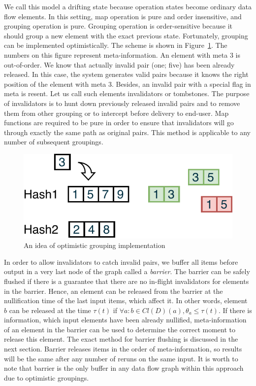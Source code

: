 We call this model a drifting state because operation states become ordinary data flow elements. In this setting, map operation is pure and order insensitive, and grouping operation is pure. Grouping operation is order-sensitive because it should group a new element with the exact previous state. Fortunately, grouping can be implemented optimistically. The scheme is shown in Figure~\ref{optimistic-grouping}. The numbers on this figure represent meta-information. An element with meta 3 is out-of-order. We know that actually invalid pair (one; five) has been already released. In this case, the system generates valid pairs because it knows the right position of the element with meta 3. Besides, an invalid pair with a special flag in meta is resent. Let us call such elements invalidators or tombstones. The purpose of invalidators is to hunt down previously released invalid pairs and to remove them from other grouping or to intercept before delivery to end-user. Map functions are required to be pure in order to ensure that invalidators will go through exactly the same path as original pairs. This method is applicable to any number of subsequent groupings.
 
\begin{figure}[htbp]
  \centering
  \includegraphics[width=.35\textwidth]{pics/grouping-invalidation}
  \caption{An idea of optimistic grouping implementation}
  \label {optimistic-grouping}
\end{figure} 
 
In order to allow invalidators to catch invalid pairs, we buffer all items before output in a very last node of the graph called a {\em barrier}. The barrier can be safely flushed if there is a guarantee that there are no in-flight invalidators for elements in the barrier. Hence, an element can be released from the barrier at the nullification time of the last input items, which affect it. In other words, element $b$ can be released at the time $\tau(t)$ if $\forall{a}:b\in{Cl(D)(a)},\theta_a \leq \tau(t)$. If there is information, which input elements have been already nullified, meta-information of an element in the barrier can be used to determine the correct moment to release this element. The exact method for barrier flushing is discussed in the next section. Barrier releases items in the order of meta-information, so results will be the same after any number of reruns on the same input. It is worth to note that barrier is the only buffer in any data flow graph within this approach due to optimistic groupings. 


